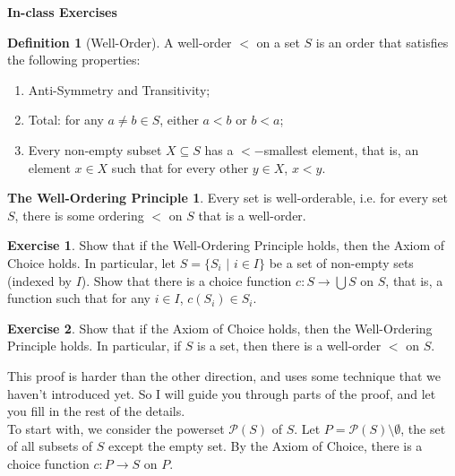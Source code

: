 \documentclass[11pt]{article}
\theoremstyle{definition}
\newtheorem{defn}{Definition}
\newtheorem{exer}{Exercise}
\newtheorem*{wo}{The Well-Ordering Principle}
\begin{document}




\begin{center}
{\LARGE \bf In-class Exercises}
\end{center}

\smallskip


\begin{defn}[Well-Order]
A well-order $<$ on a set $S$ is an order that satisfies the following properties:
\begin{enumerate}
\item Anti-Symmetry and Transitivity;
\item Total: for any $a \neq b \in S$, either $a < b$ or $b <a$;
\item Every non-empty subset $X \subseteq S$ has a $<-$smallest element, that is, an element $x \in X$ such that for every other $y \in X$, $x <y$.
\end{enumerate}
\end{defn}

\begin{wo}
Every set is well-orderable, i.e. for every set $S$, there is some ordering $<$ on $S$ that is a well-order.
\end{wo}

\begin{exer}
Show that if the Well-Ordering Principle holds, then the Axiom of Choice holds. In particular, let $S = \{S_i \, \, | \, \, i \in I \}$ be a set of non-empty sets (indexed by $I$). Show that there is a choice function $c: S \rightarrow \bigcup S$ on $S$, that is, a function such that for any $i \in I$, $c(S_i) \in S_i$.
\end{exer}

\begin{exer}
Show that if the Axiom of Choice holds, then the Well-Ordering Principle holds. In particular, if $S$ is a set, then there is a well-order $<$ on $S$.
\end{exer}

\noindent
This proof is harder than the other direction, and uses some technique that we haven't introduced yet. So I will guide you through parts of the proof, and let you fill in the rest of the details. \\

\noindent
To start with, we consider the powerset $\mathcal{P}(S)$ of $S$. Let $P = \mathcal{P}(S) \setminus \emptyset$, the set of all subsets of $S$ except the empty set. By the Axiom of Choice, there is a choice function $c: P \rightarrow S$ on $P$. \\
\end{document}
